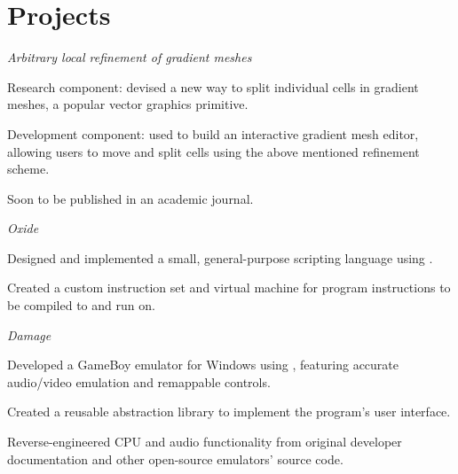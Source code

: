\section*{Projects}
\begin{cventries}
  {\textit{Arbitrary local refinement of gradient meshes}}
  {}
  {}
  {%
    \begin{cvitems}
    \item Research component: devised a new way to split individual cells in gradient meshes, a popular vector graphics primitive.
    \item Development component: used  to build an interactive gradient mesh editor, allowing users to move and split cells using the above mentioned refinement scheme.
    \item Soon to be published in an academic journal.
    \end{cvitems}
  }
  {\textit{Oxide}}
  {}
  {}
  {%
    \begin{cvitems}
    \item Designed and implemented a small, general-purpose scripting language using .\textbf{}
    \item Created a custom instruction set and virtual machine for program instructions to be compiled to and run on.
    \end{cvitems}
  }
  {\textit{Damage}}
  {}
  {}
  {%
    \begin{cvitems}
    \item Developed a GameBoy emulator for Windows using , featuring accurate audio/video emulation and remappable controls.\textbf{}
    \item Created a reusable  abstraction library to implement the program's user interface.
    \item Reverse-engineered CPU and audio functionality from original developer documentation and other open-source emulators' source code.

\end{cvitems}}
\end{cventries}
